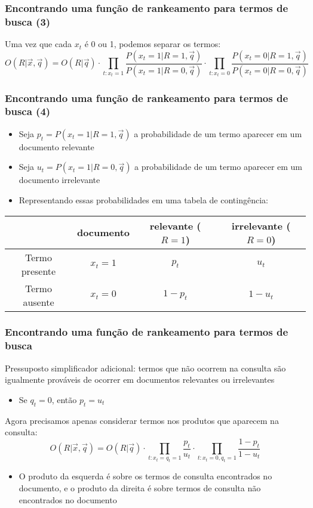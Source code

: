 \documentclass[compress]{beamer}
\begin{document}
\begin{frame}
\frametitle{Encontrando uma função de rankeamento para termos de busca (3)}
\pause

Uma vez que cada $x_t$ é 0 ou 1, podemos separar os termos:
\pause
\begin{equation}
\nonumber
O(R|\vec{x},\vec{q}) = O(R|\vec{q}) \cdot
\prod_{t: x_t=1}
\frac{P(x_t=1|R=1,\vec{q})}{P(x_t=1|R=0,\vec{q})} \cdot
\prod_{t: x_t=0}
\frac{P(x_t=0|R=1,\vec{q})}{P(x_t=0|R=0,\vec{q})}
\end{equation}

\end{frame}
\begin{frame}[<+->]
\frametitle{Encontrando uma função de rankeamento para termos de busca (4)}
\pause
\begin{itemize}
\item Seja $p_t = P(x_t=1|R=1,\vec{q})$ a probabilidade de um termo aparecer em um documento relevante
\pause
\item Seja $u_t = P(x_t = 1|R=0,\vec{q})$ a probabilidade de um termo aparecer em um documento irrelevante

\pause
\item Representando essas probabilidades em uma tabela de contingência:
\end{itemize}

\bigskip

\begin{tabular}[t]{|cc|cc|}
\hline
             & documento & relevante ($R=1$) & irrelevante ($R=0$) \\ \hline
Termo presente & $x_t = 1$ & $p_t$ & $u_t$  \\
Termo ausente  & $x_t = 0$ & $1-p_t$ & $1-u_t$ \\ \hline
\end{tabular}

\end{frame}
\begin{frame}[<+->]
\frametitle{Encontrando uma função de rankeamento para termos de busca}
\pause[2]

Pressuposto simplificador adicional: termos que não ocorrem na consulta são igualmente prováveis de ocorrer em documentos relevantes ou irrelevantes
\begin{itemize}
\item Se $q_t = 0$, então $p_t = u_t$
\end{itemize} 

Agora precisamos apenas considerar termos nos produtos que aparecem na consulta:
\begin{equation}
\nonumber
O(R|\vec{x},\vec{q}) = O(R|\vec{q}) \cdot
\prod_{t: x_t = q_t =1}
\frac{p_t}{u_t} \cdot
\prod_{t: x_t=0,q_t=1}
\frac{1-p_t}{1-u_t}
\end{equation}
\begin{itemize}

\item O produto da esquerda é sobre os termos de consulta encontrados no documento, e o produto da direita é sobre termos de consulta não encontrados no documento
\end{itemize}
\end{frame}
\end{document}
